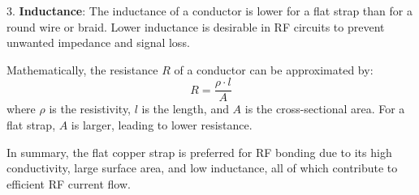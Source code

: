 3. \textbf{Inductance}: The inductance of a conductor is lower for a flat strap than for a round wire or braid. Lower inductance is desirable in RF circuits to prevent unwanted impedance and signal loss.

Mathematically, the resistance \(R\) of a conductor can be approximated by:
\[ R = \frac{\rho \cdot l}{A} \]
where \(\rho\) is the resistivity, \(l\) is the length, and \(A\) is the cross-sectional area. For a flat strap, \(A\) is larger, leading to lower resistance.

In summary, the flat copper strap is preferred for RF bonding due to its high conductivity, large surface area, and low inductance, all of which contribute to efficient RF current flow.

